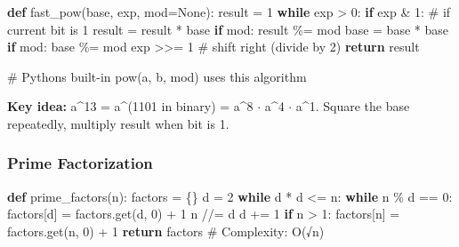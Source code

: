\documentclass[11pt]{article}
\newenvironment{Shaded}{\begin{snugshade}}{\end{snugshade}}
\newcommand{\CommentTok}[1]{\textcolor[rgb]{0.48,0.49,0.49}{#1}}
\newcommand{\ControlFlowTok}[1]{\textcolor[rgb]{0.99,0.74,0.29}{\textbf{#1}}}
\newcommand{\DecValTok}[1]{\textcolor[rgb]{0.96,0.45,0.00}{#1}}
\newcommand{\KeywordTok}[1]{\textcolor[rgb]{0.81,0.81,0.76}{\textbf{#1}}}
\newcommand{\NormalTok}[1]{\textcolor[rgb]{0.81,0.81,0.76}{#1}}
\newcommand{\OperatorTok}[1]{\textcolor[rgb]{0.81,0.81,0.76}{#1}}
\newcommand{\VariableTok}[1]{\textcolor[rgb]{0.15,0.68,0.68}{#1}}
\begin{document}
\begin{Shaded}
\begin{Highlighting}[]
\KeywordTok{def}\NormalTok{ fast\_pow(base, exp, mod}\OperatorTok{=}\VariableTok{None}\NormalTok{):}
\NormalTok{    result }\OperatorTok{=} \DecValTok{1}
    \ControlFlowTok{while}\NormalTok{ exp }\OperatorTok{\textgreater{}} \DecValTok{0}\NormalTok{:}
        \ControlFlowTok{if}\NormalTok{ exp }\OperatorTok{\&} \DecValTok{1}\NormalTok{:               }\CommentTok{\# if current bit is 1}
\NormalTok{            result }\OperatorTok{=}\NormalTok{ result }\OperatorTok{*}\NormalTok{ base}
            \ControlFlowTok{if}\NormalTok{ mod: result }\OperatorTok{\%=}\NormalTok{ mod}
\NormalTok{        base }\OperatorTok{=}\NormalTok{ base }\OperatorTok{*}\NormalTok{ base}
        \ControlFlowTok{if}\NormalTok{ mod: base }\OperatorTok{\%=}\NormalTok{ mod}
\NormalTok{        exp }\OperatorTok{\textgreater{}\textgreater{}=} \DecValTok{1}                 \CommentTok{\# shift right (divide by 2)}
    \ControlFlowTok{return}\NormalTok{ result}

\CommentTok{\# Python\textquotesingle{}s built{-}in pow(a, b, mod) uses this algorithm}
\end{Highlighting}
\end{Shaded}

\textbf{Key idea:} a\^{}13 = a\^{}(1101 in binary) = a\^{}8 \(\cdot\) a\^{}4 \(\cdot\) a\^{}1. Square the base repeatedly, multiply result when bit is 1.

\subsubsection{Prime Factorization}\label{prime-factorization}


\begin{Shaded}
\begin{Highlighting}[]
\KeywordTok{def}\NormalTok{ prime\_factors(n):}
\NormalTok{    factors }\OperatorTok{=}\NormalTok{ \{\}}
\NormalTok{    d }\OperatorTok{=} \DecValTok{2}
    \ControlFlowTok{while}\NormalTok{ d }\OperatorTok{*}\NormalTok{ d }\OperatorTok{\textless{}=}\NormalTok{ n:}
        \ControlFlowTok{while}\NormalTok{ n }\OperatorTok{\%}\NormalTok{ d }\OperatorTok{==} \DecValTok{0}\NormalTok{:}
\NormalTok{            factors[d] }\OperatorTok{=}\NormalTok{ factors.get(d, }\DecValTok{0}\NormalTok{) }\OperatorTok{+} \DecValTok{1}
\NormalTok{            n }\OperatorTok{//=}\NormalTok{ d}
\NormalTok{        d }\OperatorTok{+=} \DecValTok{1}
    \ControlFlowTok{if}\NormalTok{ n }\OperatorTok{\textgreater{}} \DecValTok{1}\NormalTok{:}
\NormalTok{        factors[n] }\OperatorTok{=}\NormalTok{ factors.get(n, }\DecValTok{0}\NormalTok{) }\OperatorTok{+} \DecValTok{1}
    \ControlFlowTok{return}\NormalTok{ factors}
\CommentTok{\# Complexity: O(√n)}
\end{Highlighting}
\end{Shaded}
\end{document}
